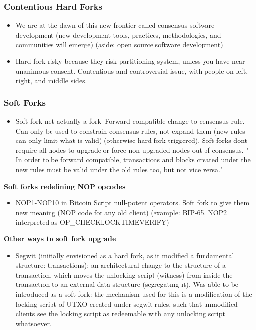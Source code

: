 \documentclass[english, 11pt]{article}
\begin{document}
\subsubsection{Contentious Hard Forks}
\begin{itemize}
    \item We are at the dawn of this new frontier called consensus software development (new development tools, practices, methodologies, and communities will emerge) (aside: open source software development)
    \item Hard fork risky because they risk partitioning system, unless you have near-unanimous consent. Contentious and controversial issue, with people on left, right, and middle sides.
\end{itemize}
\subsubsection{Soft Forks}
\begin{itemize}
    \item Soft fork not actually a fork. Forward-compatible change to consensus rule. Can only be used to constrain consensus rules, not expand them (new rules can only limit what is valid) (otherwise hard fork triggered). Soft forks dont require all nodes to upgrade or force non-upgraded nodes out of consensus. " In order to be forward compatible, transactions and blocks created under the new rules must be valid under the old rules too, but not vice versa."
\end{itemize}

\textbf{Soft forks redefining NOP opcodes}
\begin{itemize}
    \item NOP1-NOP10 in Bitcoin Script null-potent operators. Soft fork to give them new meaning (NOP code for any old client) (example: BIP-65, NOP2 interpreted as OP_CHECKLOCKTIMEVERIFY)
\end{itemize}

\textbf{Other ways to soft fork upgrade}
\begin{itemize}
    \item Segwit (initially envisioned as a hard fork, as it modified a fundamental structure: transactions): an architectural change to the structure of a transaction, which moves the unlocking script (witness) from inside the transaction to an external data structure (segregating it). Was able to be introduced as a soft fork: the mechanism used for this is a modification of the locking script of UTXO created under segwit rules, such that unmodified clients see the locking script as redeemable with any unlocking script whatsoever. 
\end{itemize}
\end{document}
